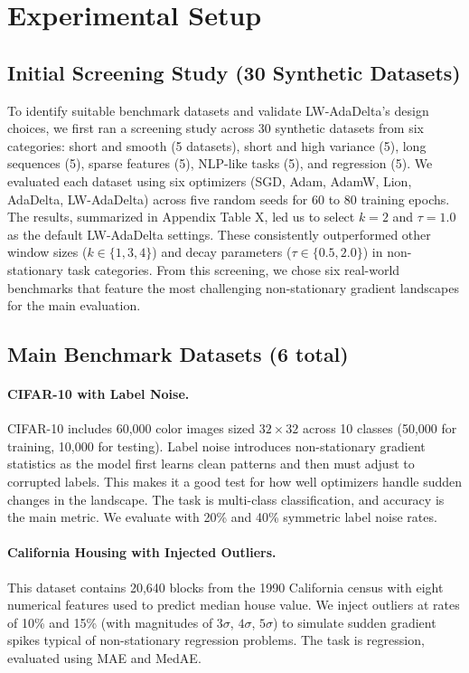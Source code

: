 \documentclass[11pt,a4paper]{article}
\begin{document}
\section{Experimental Setup}
\label{sec:experimental}

\subsection{Initial Screening Study (30 Synthetic Datasets)}

To identify suitable benchmark datasets and validate LW-AdaDelta's design choices, we first ran a screening study across 30 synthetic datasets from six categories: short and smooth (5 datasets), short and high variance (5), long sequences (5), sparse features (5), NLP-like tasks (5), and regression (5). We evaluated each dataset using six optimizers (SGD, Adam, AdamW, Lion, AdaDelta, LW-AdaDelta) across five random seeds for 60 to 80 training epochs. The results, summarized in Appendix Table X, led us to select $k=2$ and $\tau=1.0$ as the default LW-AdaDelta settings. These consistently outperformed other window sizes ($k \in \{1,3,4\}$) and decay parameters ($\tau \in \{0.5,2.0\}$) in non-stationary task categories. From this screening, we chose six real-world benchmarks that feature the most challenging non-stationary gradient landscapes for the main evaluation.

\subsection{Main Benchmark Datasets (6 total)}

\paragraph{CIFAR-10 with Label Noise.} CIFAR-10 \citep{krizhevsky2009cifar} includes 60,000 color images sized $32 \times 32$ across 10 classes (50,000 for training, 10,000 for testing). Label noise introduces non-stationary gradient statistics as the model first learns clean patterns and then must adjust to corrupted labels. This makes it a good test for how well optimizers handle sudden changes in the landscape. The task is multi-class classification, and accuracy is the main metric. We evaluate with 20\% and 40\% symmetric label noise rates.

\paragraph{California Housing with Injected Outliers.} This dataset \citep{pace1997california} contains 20,640 blocks from the 1990 California census with eight numerical features used to predict median house value. We inject outliers at rates of 10\% and 15\% (with magnitudes of $3\sigma$, $4\sigma$, $5\sigma$) to simulate sudden gradient spikes typical of non-stationary regression problems. The task is regression, evaluated using MAE and MedAE.
\end{document}
